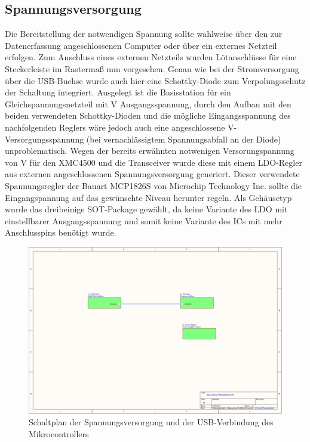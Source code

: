 \subsection{Spannungsversorgung}
Die Bereitstellung der notwendigen Spannung sollte wahlweise über den zur Datenerfassung angeschlossenen Computer oder über ein externes Netzteil erfolgen. Zum Anschluss eines externen Netzteils wurden Lötanschlüsse für eine Steckerleiste im Rastermaß \unit[2,54]{mm} vorgesehen. Genau wie bei der Stromversorgung über die USB-Buchse wurde auch hier eine Schottky-Diode zum Verpolungsschutz der Schaltung integriert. Ausgelegt ist die Basisstation für ein Gleichspannungsnetzteil mit \unit[5]{V} Ausgangsspannung, durch den Aufbau mit den beiden verwendeten Schottky-Dioden und die mögliche Eingangsspannung des nachfolgenden Reglers wäre jedoch auch eine angeschlossene \unit[6]{V}-Versorgungsspannung (bei vernachlässigtem Spannungsabfall an der Diode) unproblematisch.
Wegen der bereits erwähnten notwenigen Versorungspannung von \unit[3,3]{V} für den XMC4500 und die Transceiver wurde diese mit einem \ac{LDO}-Regler aus externen angeschlossenen Spannungsversorgung generiert. Dieser verwendete Spannungsregler der Bauart MCP1826S von Microchip Technology Inc. sollte die Eingangspannung auf das gewünschte Niveau herunter regeln.
Als Gehäusetyp wurde das dreibeinige \ac{SOT}-Package gewählt, da keine Variante des \ac{LDO} mit einstellbarer Ausgangsspannung und somit keine Variante des \acp{IC} mit mehr Anschlusspins benötigt wurde.
\begin{figure}[h]
	\centering
	\includegraphics[width=\linewidth,page=3]{"../../Altium/mobile Basisstation/Project Outputs for mobile Basisstation/Basisstation Schematics"}
	\caption{Schaltplan der Spannungsversorgung und der USB-Verbindung des Mikrocontrollers}
	\label{fig:schemSupply}
\end{figure}

